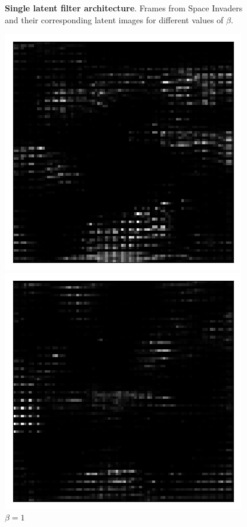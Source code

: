 \begin{figure}[h!]
\begin{multicols}{4}
    \caption{$\beta=16$}
\end{multicols}
\caption{\textbf{Single latent filter architecture}. Frames from Space Invaders and their corresponding latent images for different values of $\beta$.}
\label{fig:latent_image_originals_and_latent_spaces}
\end{figure}


\begin{figure}[h!]
\centering
\captionsetup{justification=centering}
\begin{multicols}{3}
    \includegraphics[scale=0.4]{figures/results/latent_image/beta_1_prior_sample_1.png}
    \caption{$\beta=1$}
    \includegraphics[scale=0.4]{figures/results/latent_image/beta_4_prior_sample_2.png}

\end{multicols}
\end{figure}
